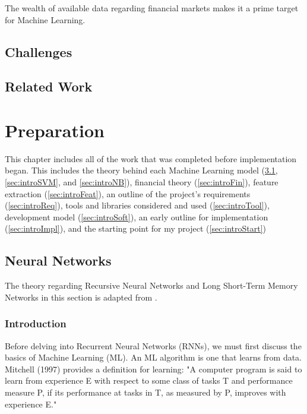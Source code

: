 \documentclass[12pt,a4paper,twoside,openright]{report}
\begin{document}
The wealth of available data regarding financial markets makes it a prime target for Machine Learning.



\section{Challenges}



\section{Related Work}



\chapter{Preparation}

This chapter includes all of the work that was completed before implementation began.
This includes the theory behind each Machine Learning model (\cref{sec:introNN},
\cref{sec:introSVM}, and \cref{sec:introNB}), financial
theory (\cref{sec:introFin}), feature extraction (\cref{sec:introFeat}), 
an outline of the project's requirements (\cref{sec:introReq}), tools and libraries
considered and used (\cref{sec:introTool}), development model (\cref{sec:introSoft}),
an early outline for implementation (\cref{sec:introImpl}), and the starting point
for my project (\cref{sec:introStart})

\section{Neural Networks}
\label{sec:introNN}

The theory regarding Recursive Neural Networks and
Long Short-Term Memory Networks in this section is adapted from \cite{Goodfellow-et-al-2016}.

\subsection{Introduction}

Before delving into Recurrent Neural Networks (RNNs), we must first discuss
the basics of Machine Learning (ML). An ML algorithm is one that learns from
data. Mitchell (1997) provides a definition for learning:
"A computer program is said to learn from experience E with respect to some
class of tasks T and performance measure P, if its performance at tasks in T, as
measured by P, improves with experience E." \cite{Mitchell97} 
\end{document}
